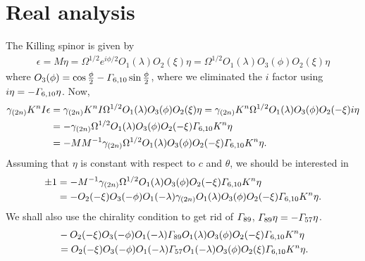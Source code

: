 \documentclass[11pt]{article}
\let\oldGamma=\Gamma
\renewcommand{\Gamma}{\mathnormal{\oldGamma}}
\begin{document}
\section{Real analysis}
The Killing spinor is given by
\begin{align}
\epsilon = M \eta = \Omega^{1/2} e^{i\phi/2} O_1(\lambda) O_2(\xi) \eta
= \Omega^{1/2} O_1(\lambda) O_3(\phi) O_2(\xi) \eta
\end{align}
where $O_3(\phi)=\cos\frac{\phi}{2}-\Gamma_{6,10}\sin\frac{\phi}{2}$, where we eliminated the $i$ factor using $i\eta = -\Gamma_{6,10}\eta$.
Now,
\begin{align}
\gamma_{(2n)} K^n I \epsilon
&= \gamma_{(2n)} K^n I \Omega^{1/2} O_1(\lambda) O_3(\phi) O_2(\xi) \eta
= \gamma_{(2n)} K^n \Omega^{1/2} O_1(\lambda) O_3(\phi) O_2(-\xi) i \eta\nonumber\\
&= -\gamma_{(2n)}\Omega^{1/2} O_1(\lambda) O_3(\phi) O_2(-\xi) \Gamma_{6,10} K^n \eta\nonumber\\
&= -M M^{-1}\gamma_{(2n)}\Omega^{1/2} O_1(\lambda) O_3(\phi) O_2(-\xi) \Gamma_{6,10} K^n \eta.
\end{align}
Assuming that $\eta$ is constant with respect to $c$ and $\theta$, we should be interested in
\begin{align}
\pm 1 & = -M^{-1}\gamma_{(2n)}\Omega^{1/2} O_1(\lambda) O_3(\phi) O_2(-\xi) \Gamma_{6,10} K^n \eta\nonumber\\
 &=
  -O_2(-\xi)O_3(-\phi)O_1(-\lambda)\gamma_{(2n)}O_1(\lambda) O_3(\phi) O_2(-\xi) \Gamma_{6,10} K^n \eta.
\end{align}
We shall also use the chirality condition to get rid of $\Gamma_{89}$, $\Gamma_{89}\eta = -\Gamma_{57}\eta$.
\begin{align}
&-O_2(-\xi)O_3(-\phi)O_1(-\lambda)\Gamma_{89}O_1(\lambda) O_3(\phi) O_2(-\xi) \Gamma_{6,10} K^n \eta\nonumber\\
&=
O_2(-\xi)O_3(-\phi)O_1(-\lambda)\Gamma_{57}O_1(-\lambda) O_3(\phi) O_2(\xi) \Gamma_{6,10} K^n \eta.
\end{align}
\end{document}
